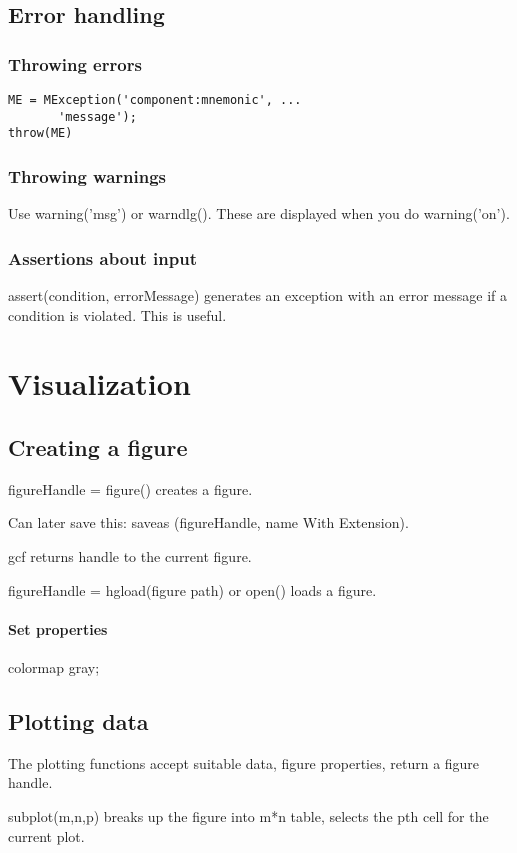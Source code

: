 \subsection{Error handling}
\subsubsection{Throwing errors}
\begin{verbatim}
ME = MException('component:mnemonic', ...
       'message');
throw(ME)
\end{verbatim}


\subsubsection{Throwing warnings}
Use warning('msg') or warndlg(). These are displayed when you do warning('on').

\subsubsection{Assertions about input}
assert(condition, errorMessage) generates an exception with an error message if a condition is violated. This is useful.


\section{Visualization}
\subsection{Creating a figure}
figureHandle = figure() creates a figure.

Can later save this: saveas (figureHandle, name With Extension).

gcf returns handle to the current figure.

figureHandle = hgload(figure path) or open() loads a figure.

\paragraph*{Set properties}
colormap gray;


\subsection{Plotting data}
The plotting functions accept suitable data, figure properties, return a figure handle.

subplot(m,n,p) breaks up the figure into m*n table, selects the pth cell for the current plot.

